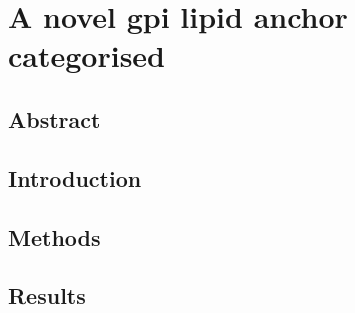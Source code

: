 
\chapter{A novel \gls{gpi} lipid anchor categorised} %
\section{Abstract}
\section{Introduction}
\section{Methods}
\section{Results}
